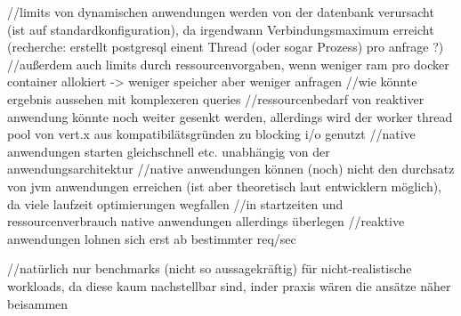 //limits von dynamischen anwendungen werden von der datenbank verursacht (ist auf standardkonfiguration), da irgendwann
Verbindungsmaximum erreicht (recherche: erstellt postgresql einent Thread (oder sogar Prozess) pro anfrage ?)
//außerdem auch limits durch ressourcenvorgaben, wenn weniger ram pro docker container allokiert -> weniger speicher aber weniger anfragen
//wie könnte ergebnis aussehen mit komplexeren queries
//ressourcenbedarf von reaktiver anwendung könnte noch weiter gesenkt werden, allerdings wird der worker thread pool von vert.x aus
kompatibilätsgründen zu blocking i/o genutzt
//native anwendungen starten gleichschnell etc. unabhängig von der anwendungsarchitektur
//native anwendungen können (noch) nicht den durchsatz von jvm anwendungen erreichen (ist aber theoretisch laut entwicklern möglich), da
viele laufzeit optimierungen wegfallen
//in startzeiten und ressourcenverbrauch native anwendungen allerdings überlegen
//reaktive anwendungen lohnen sich erst ab bestimmter req/sec

//natürlich nur benchmarks (nicht so aussagekräftig) für nicht-realistische workloads, da diese kaum nachstellbar sind,
inder praxis wären die ansätze näher beisammen